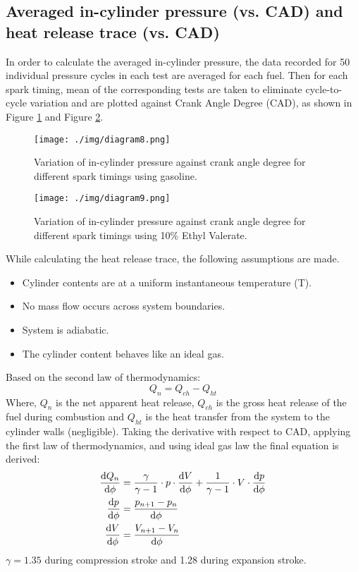 \subsection*{Averaged in-cylinder pressure (vs. CAD) and heat release trace (vs. CAD)}
In order to calculate the averaged in-cylinder pressure, the data recorded for 50 individual pressure cycles in each test are averaged for each fuel. Then for each spark timing, mean of the corresponding tests are taken to eliminate cycle-to-cycle variation and are plotted against Crank Angle Degree (CAD), as shown in Figure \ref{q1-f1} and Figure \ref{q1-f2}.
\begin{figure}[H]
    \centering
    \texttt{[image: ./img/diagram8.png]}
    \caption{Variation of in-cylinder pressure against crank angle degree for different spark timings using gasoline.}
    \label{q1-f1}
\end{figure}
\begin{figure}[H]
    \centering
    \texttt{[image: ./img/diagram9.png]}
    \caption{Variation of in-cylinder pressure against crank angle degree for different spark timings using 10\% Ethyl Valerate.}
    \label{q1-f2}
\end{figure}
While calculating the heat release trace, the following assumptions are made.
\begin{itemize}
    \item Cylinder contents are at a uniform instantaneous temperature (T).
    \item No mass flow occurs across system boundaries.
    \item System is adiabatic.
    \item The cylinder content behaves like an ideal gas.
\end{itemize}
Based on the second law of thermodynamics:
\begin{equation}
    Q_n = Q_{ch} - Q_{ht}
\end{equation}
Where, $Q_n$ is the net apparent heat release, $Q_{ch}$ is the gross heat release of the fuel during combustion and $Q_{ht}$ is the heat transfer from the system to the cylinder walls (negligible). Taking the derivative with respect to CAD, applying the first law of thermodynamics, and using ideal gas law the final equation is derived:
\begin{align}
    \frac{\dif Q_{n}}{\dif \phi} & = \frac{\gamma}{\gamma - 1}\cdot p\cdot \frac{\dif V}{\dif \phi} + \frac{1}{\gamma - 1} \cdot V \cdot \frac{\dif p}{\dif \phi} \\
    \frac{\dif p}{\dif \phi}     & = \frac{p_{n+1}-p_n}{\dif \phi}                                                                                                \\
    \frac{\dif V}{\dif \phi}     & = \frac{V_{n+1}-V_n}{\dif \phi}
\end{align}
$\gamma = 1.35$ during compression stroke and 1.28 during expansion stroke.

